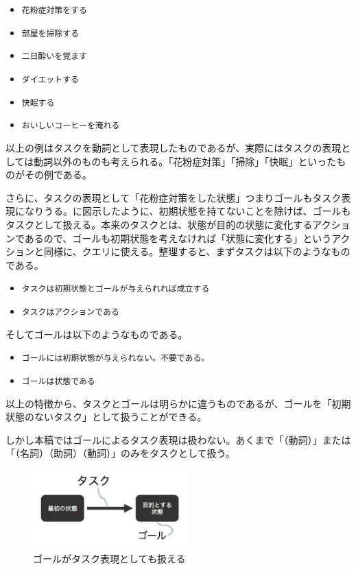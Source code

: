 \documentclass[submit,techreq]{ipsj}
\def\|{\verb|}
\begin{document}
\begin{itemize}
\item \|花粉症対策をする|
\item \|部屋を掃除する|
\item \|二日酔いを覚ます|
\item \|ダイエットする|
\item \|快眠する|
\item \|おいしいコーヒーを淹れる|
\end{itemize}

以上の例はタスクを動詞として表現したものであるが、実際にはタスクの表現としては動詞以外のものも考えられる。「花粉症対策」「掃除」「快眠」といったものがその例である。

さらに、タスクの表現として「花粉症対策をした状態」つまりゴールもタスク表現になりうる。に図示したように、初期状態を持てないことを除けば、ゴールもタスクとして扱える。本来のタスクとは、状態が目的の状態に変化するアクションであるので、ゴールも初期状態を考えなければ「状態に変化する」というアクションと同様に、クエリに使える。整理すると、まずタスクは以下のようなものである。

\begin{itemize}
\item \|タスクは初期状態とゴールが与えられれば成立する|
\item \|タスクはアクションである|
\end{itemize}

そしてゴールは以下のようなものである。

\begin{itemize}
\item \|ゴールには初期状態が与えられない。不要である。|
\item \|ゴールは状態である|
\end{itemize}


以上の特徴から、タスクとゴールは明らかに違うものであるが、ゴールを「初期状態のないタスク」として扱うことができる。

しかし本稿ではゴールによるタスク表現は扱わない。あくまで「（動詞）」または「（名詞）（助詞）（動詞）」のみをタスクとして扱う。


\begin{figure}[tb]
\includegraphics[width=6cm, bb=0 0 350 319]{goal_can_be_task.jpg}
\caption{ゴールがタスク表現としても扱える}
\label{fig:goal_can_be_task}
\end{figure}
\end{document}
